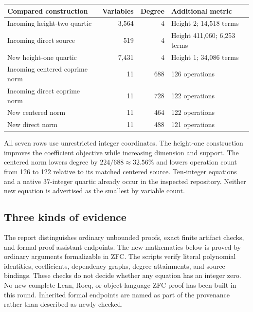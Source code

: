 \documentclass[11pt,a4paper]{article}
\theoremstyle{definition}
\theoremstyle{remark}
\begin{document}
\begin{center}
\begin{tabular}{lrrl}
\toprule
Compared construction & Variables & Degree & Additional metric\\
\midrule
Incoming height-two quartic \cite{heighttwo} & 3,564 & 4 & Height 2; 14,518 terms\\
Incoming direct source \cite{round14} & 519 & 4 & Height 411,060; 6,253 terms\\
New height-one quartic & 7,431 & 4 & Height 1; 34,086 terms\\
\midrule
Incoming centered coprime norm \cite{coprime} & 11 & 688 & 126 operations\\
Incoming direct coprime norm \cite{coprime} & 11 & 728 & 122 operations\\
New centered norm & 11 & 464 & 122 operations\\
New direct norm & 11 & 488 & 121 operations\\
\bottomrule
\end{tabular}
\end{center}
All seven rows use unrestricted integer coordinates. The height-one
construction improves the coefficient objective while increasing
dimension and support. The centered norm lowers degree by
$224/688\approx32.56\%$ and lowers operation count from 126 to 122
relative to its matched centered source. Ten-integer equations and a
native 37-integer quartic already occur in the inspected repository.
Neither new equation is advertised as the smallest by variable count.

\subsection{Three kinds of evidence}

The report distinguishes ordinary unbounded proofs, exact finite
artifact checks, and formal proof-assistant endpoints. The new
mathematics below is proved by ordinary arguments formalizable in ZFC.
The scripts verify literal polynomial identities, coefficients,
dependency graphs, degree attainments, and source bindings. These checks
do not decide whether any equation has an integer zero. No new complete
Lean, Rocq, or object-language ZFC proof has been built in this round.
Inherited formal endpoints are named as part of the provenance rather
than described as newly checked.





\end{document}
